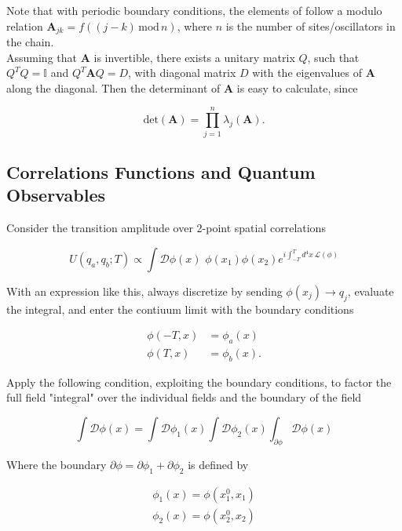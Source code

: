 \noindent Note that with periodic boundary conditions, the elements of follow a modulo relation $\textbf{A}_{jk} = f((j-k) \, \text{mod} \, n)$, where $n$ is the number of sites/oscillators in the chain. \\

\noindent Assuming that $\textbf{A}$ is invertible, there exists a unitary matrix $Q$, such that $Q^T Q = \mathbb{I}$ and $Q^T \textbf{A} Q = D$, with diagonal matrix $D$ with the eigenvalues of $\textbf{A}$ along the diagonal. Then the determinant of $\textbf{A}$ is easy to calculate, since 

\begin{equation}
\text{det}(\textbf{A}) = \prod_{j=1}^n \lambda_j (\textbf{A}).
\end{equation}

\subsection*{Correlations Functions and Quantum Observables}

\noindent Consider the transition amplitude over 2-point spatial correlations

\begin{equation}
U(q_a, q_b; T) \propto \int \mathcal{D} \phi(x) \,\, \phi(x_1) \phi(x_2) e^{i \int_{-T}^T d^4 x \, \mathcal{L}(\phi)}
\end{equation}

\noindent With an expression like this, always discretize by sending $\phi(x_j) \rightarrow q_j$, evaluate the integral, and enter the contiuum limit with the boundary conditions

\begin{align}
\phi (-T, x) &= \phi_a (x) \\
\phi (T, x) &= \phi_b (x).
\end{align}

\noindent Apply the following condition, exploiting the boundary conditions, to factor the full field "integral" over the individual fields and the boundary of the field

\begin{equation}
\int \mathcal{D} \phi (x) = \int \mathcal{D} \phi_1 (x) \int \mathcal{D} \phi_2 (x) \int_{\partial \phi} \mathcal{D} \phi (x)
\end{equation}

\noindent Where the boundary $\partial \phi = \partial \phi_1 + \partial \phi_2$ is defined by 

\begin{align}
\phi_1 (x) = \phi(x_1^0, x_1) \\
\phi_2 (x) = \phi(x_2^0, x_2)
\end{align}

